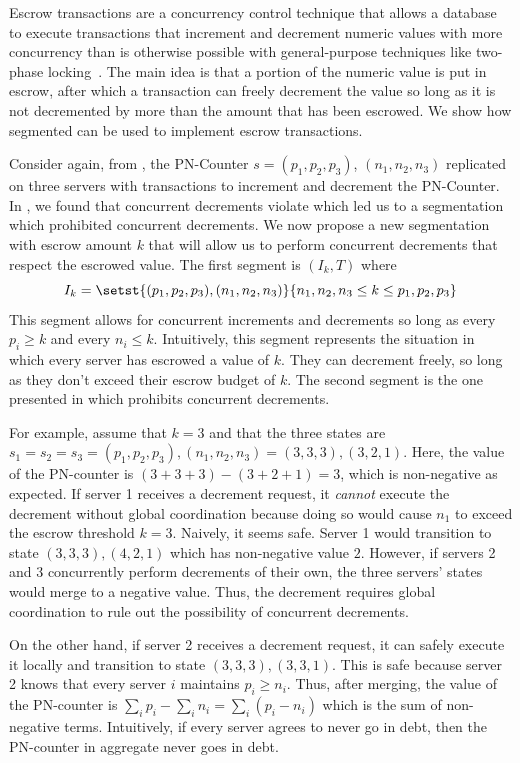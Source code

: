 Escrow transactions are a concurrency control technique that allows a database
to execute transactions that increment and decrement numeric values with more
concurrency than is otherwise possible with general-purpose techniques like
two-phase locking~\cite{o1986escrow}. The main idea is that a portion of the
numeric value is put in escrow, after which a transaction can freely decrement
the value so long as it is not decremented by more than the amount that has
been escrowed. We show how segmented \invariantconfluence{} can be used to
implement escrow transactions.

Consider again, from , the PN-Counter $s =
(p_1, p_2, p_3)$, $(n_1, n_2, n_3)$ replicated on three servers with
transactions to increment and decrement the PN-Counter. In
, we found that concurrent decrements violate
\invariantconfluence{} which led us to a segmentation which prohibited
concurrent decrements. We now propose a new segmentation with escrow amount $k$
that will allow us to perform concurrent decrements that respect the escrowed
value. The first segment is $(I_k, T)$ where
\[
  I_k = \setst{(p_1, p_2, p_3), (n_1, n_2, n_3)}%
              {n_1, n_2, n_3 \leq k \leq p_1, p_2, p_3}
\]
This segment allows for concurrent increments and decrements so long as every
$p_i \geq k$ and every $n_i \leq k$.  Intuitively, this segment represents the
situation in which every server has escrowed a value of $k$. They can decrement
freely, so long as they don't exceed their escrow budget of $k$. The second
segment is the one presented in  which
prohibits concurrent decrements.

\begin{revisions}
  For example, assume that $k = 3$ and that the three states are $s_1 = s_2 =
  s_3 = (p_1, p_2, p_3), (n_1, n_2, n_3) = (3, 3, 3), (3, 2, 1)$. Here, the
  value of the PN-counter is $(3 + 3 + 3) - (3 + 2 + 1) = 3$, which is
  non-negative as expected. If server 1 receives a decrement request, it
  \emph{cannot} execute the decrement without global coordination because doing
  so would cause $n_1$ to exceed the escrow threshold $k = 3$. Naively, it
  seems safe. Server 1 would transition to state $(3, 3, 3), (4, 2, 1)$ which
  has non-negative value $2$. However, if servers 2 and 3 concurrently perform
  decrements of their own, the three servers' states would merge to a negative
  value. Thus, the decrement requires global coordination to rule out the
  possibility of concurrent decrements.

  On the other hand, if server 2 receives a decrement request, it can safely
  execute it locally and transition to state $(3, 3, 3), (3, 3, 1)$. This is
  safe because server 2 knows that every server $i$ maintains $p_i \geq n_i$.
  Thus, after merging, the value of the PN-counter is $\sum_i p_i - \sum_i n_i
  = \sum_i (p_i - n_i)$ which is the sum of non-negative terms. Intuitively, if
  every server agrees to never go in debt, then the PN-counter in aggregate
  never goes in debt.
\end{revisions}

